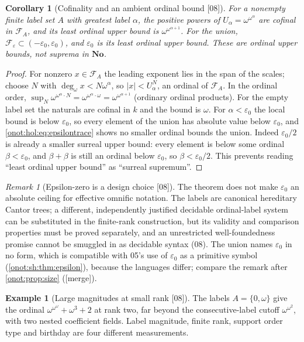 \documentclass[11pt,oneside]{article}
\numberwithin{equation}{section}
\newtheorem{corollary}[corollary]{Corollary}
\theoremstyle{definition}
\newtheorem{example}[example]{Example}
\theoremstyle{remark}
\newtheorem{remark}[remark]{Remark}
\newcommand{\No}{\mathbf{No}}
\newcommand{\ddeg}{\operatorname{deg}_{\omega}}
\newcommand{\src}[1]{\textup{\textsf{\small[#1]}}}
\newcommand{\mergetag}{\textup{\textsf{\small[merge]}}}
\begin{document}
\begin{corollary}[Cofinality and an ambient ordinal bound \src{08}]\label{onot:hol:cor:ambientbound}
For a nonempty finite label set $A$ with greatest label $\alpha$, the positive
powers of $U_\alpha=\omega^{\omega^\alpha}$ are cofinal in $\mathcal F_A$, and its
least ordinal upper bound is $\omega^{\omega^{\alpha+1}}$. For the union,
$\mathcal F_\varepsilon\subset(-\varepsilon_0,\varepsilon_0)$, and $\varepsilon_0$
is its least ordinal upper bound. These are ordinal upper bounds, not suprema in
$\No$.
\end{corollary}
\begin{proof}
For nonzero $x\in\mathcal F_A$ the leading exponent lies in the span of the
scales; choose $N$ with $\ddeg x<N\omega^\alpha$, so $|x|<U_\alpha^N$, an ordinal
of $\mathcal F_A$. In the ordinal order,
$\sup_N\omega^{\omega^\alpha\cdot N}=\omega^{\omega^\alpha\cdot\omega}=\omega^{\omega^{\alpha+1}}$
(ordinary ordinal products). For the empty label set the naturals are cofinal in
$k$ and the bound is $\omega$. For $\alpha<\varepsilon_0$ the local bound is below
$\varepsilon_0$, so every element of the union has absolute value below
$\varepsilon_0$, and \eqref{onot:hol:eq:epsilontrace} shows no smaller ordinal
bounds the union. Indeed $\varepsilon_0/2$ is already a smaller surreal upper
bound: every element is below some ordinal $\beta<\varepsilon_0$, and $\beta+\beta$
is still an ordinal below $\varepsilon_0$, so $\beta<\varepsilon_0/2$. This
prevents reading ``least ordinal upper bound'' as ``surreal supremum''.
\end{proof}

\begin{remark}[Epsilon-zero is a design choice \src{08}]\label{onot:hol:rem:design}
The theorem does not make $\varepsilon_0$ an absolute ceiling for effective
omnific notation. The labels are canonical hereditary Cantor trees; a different,
independently justified decidable ordinal-label system can be substituted in the
finite-rank construction, but its validity and comparison properties must be
proved separately, and an unrestricted well-foundedness promise cannot be
smuggled in as decidable syntax (08). The union names $\varepsilon_0$ in no form,
which is compatible with 05's use of $\varepsilon_0$ as a primitive symbol
(\cref{onot:sh:thm:epsilon}), because the languages differ; compare the remark
after \cref{onot:prop:size} (\mergetag).
\end{remark}

\begin{example}[Large magnitudes at small rank \src{08}]\label{onot:hol:ex:magnitude}
The labels $A=\{0,\omega\}$ give the ordinal $\omega^{\omega^\omega}+\omega^3+2$ at
rank two, far beyond the consecutive-label cutoff $\omega^{\omega^2}$, with two
nested coefficient fields. Label magnitude, finite rank, support order type and
birthday are four different measurements.
\end{example}
\end{document}
